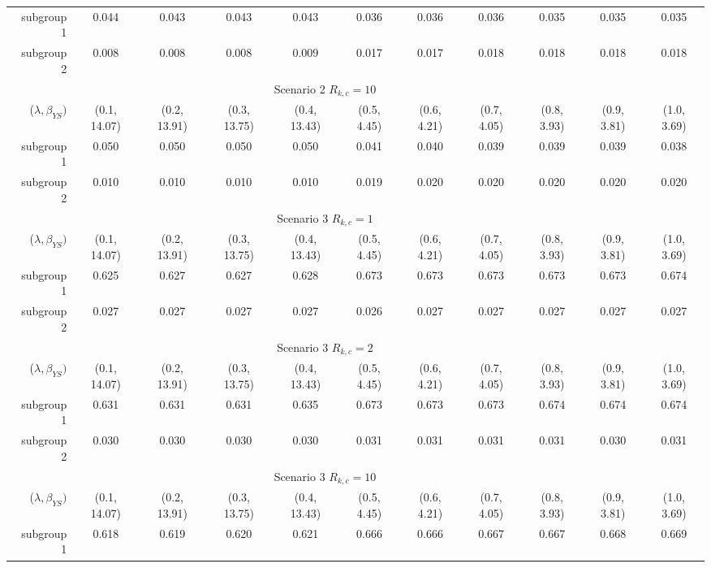 \begin{tabular}{rcccc>{\columncolor[gray]{0.9}}cccccc}
subgroup 1 &0.044 &0.043 &0.043 &0.043 &0.036 &0.036 &0.036 &0.035 &0.035 &0.035 \\ 
subgroup 2 &0.008 &0.008 &0.008 &0.009 &0.017 &0.017 &0.018 &0.018 &0.018 &0.018 \\ 
\bottomrule  
\multicolumn{10}{c}{Scenario 2 $R_{k,c} = 10$}\\ 
\midrule 
($\lambda, \beta_{YS})$ & (0.1, 14.07)&(0.2, 13.91)&(0.3, 13.75)&(0.4, 13.43)&(0.5, 4.45)&(0.6, 4.21)&(0.7, 4.05)&(0.8, 3.93)&(0.9, 3.81)&(1.0, 3.69) \\ 
subgroup 1 &0.050 &0.050 &0.050 &0.050 &0.041 &0.040 &0.039 &0.039 &0.039 &0.038 \\ 
subgroup 2 &0.010 &0.010 &0.010 &0.010 &0.019 &0.020 &0.020 &0.020 &0.020 &0.020 \\ 
\bottomrule  
\multicolumn{10}{c}{Scenario 3 $R_{k,c} = 1$}\\ 
\midrule 
($\lambda, \beta_{YS})$ & (0.1, 14.07) & (0.2, 13.91) & (0.3, 13.75) & (0.4, 13.43) & (0.5, 4.45) & (0.6, 4.21) & (0.7, 4.05) & (0.8, 3.93) & (0.9, 3.81) & (1.0, 3.69) \\
subgroup 1              & 0.625        & 0.627        & 0.627        & 0.628        & 0.673       & 0.673       & 0.673       & 0.673       & 0.673       & 0.674       \\
subgroup 2              & 0.027        & 0.027        & 0.027        & 0.027        & 0.026       & 0.027       & 0.027       & 0.027       & 0.027       & 0.027       \\
\bottomrule  
\multicolumn{10}{c}{Scenario 3 $R_{k,c} = 2$}\\ 
\midrule 
($\lambda, \beta_{YS})$ & (0.1, 14.07)&(0.2, 13.91)&(0.3, 13.75)&(0.4, 13.43)&(0.5, 4.45)&(0.6, 4.21)&(0.7, 4.05)&(0.8, 3.93)&(0.9, 3.81)&(1.0, 3.69) \\ 
subgroup 1 &0.631 &0.631 &0.631 &0.635 &0.673 &0.673 &0.673 &0.674 &0.674 &0.674 \\ 
subgroup 2 &0.030 &0.030 &0.030 &0.030 &0.031 &0.031 &0.031 &0.031 &0.030 &0.031 \\ 
\bottomrule  
\multicolumn{10}{c}{Scenario 3 $R_{k,c} = 10$}\\ 
\midrule 
($\lambda, \beta_{YS})$ & (0.1, 14.07) & (0.2, 13.91) & (0.3, 13.75) & (0.4, 13.43) & (0.5, 4.45) & (0.6, 4.21) & (0.7, 4.05) & (0.8, 3.93) & (0.9, 3.81) & (1.0, 3.69) \\
subgroup 1              & 0.618        & 0.619        & 0.620        & 0.621        & 0.666       & 0.666       & 0.667       & 0.667       & 0.668       & 0.669       \\

\end{tabular}
